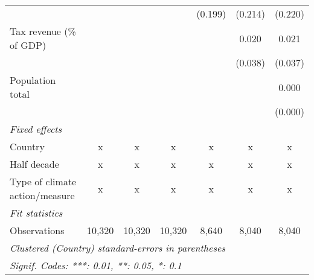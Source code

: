 \begin{tabular}{lcccccc}
                                                                            &         &         &         & (0.199) & (0.214) & (0.220)\\   
   Tax revenue (\% of GDP)                                                  &         &         &         &         & 0.020   & 0.021\\   
                                                                            &         &         &         &         & (0.038) & (0.037)\\   
   Population total                                                         &         &         &         &         &         & 0.000\\   
                                                                            &         &         &         &         &         & (0.000)\\   
   \emph{Fixed effects}\\
   Country                                                                  & x       & x       & x       & x       & x       & x\\  
   Half decade                                                              & x       & x       & x       & x       & x       & x\\  
   Type of climate action/measure                                           & x       & x       & x       & x       & x       & x\\  
   \midrule \emph{Fit statistics}\\
   Observations                                                             & 10,320  & 10,320  & 10,320  & 8,640   & 8,040   & 8,040\\  
   \midrule
   \multicolumn{7}{l}{\emph{Clustered (Country) standard-errors in parentheses}}\\
   \multicolumn{7}{l}{\emph{Signif. Codes: ***: 0.01, **: 0.05, *: 0.1}}\\
\end{tabular}
\par\endgroup


